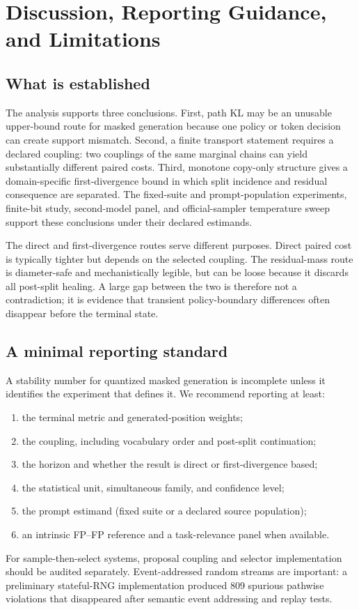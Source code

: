 \section{Discussion, Reporting Guidance, and Limitations}
\label{sec:discussion}

\subsection{What is established}
The analysis supports three conclusions. First, path KL may be an unusable upper-bound route for masked generation because one policy or token decision can create support mismatch. Second, a finite transport statement requires a declared coupling: two couplings of the same marginal chains can yield substantially different paired costs. Third, monotone copy-only structure gives a domain-specific first-divergence bound in which split incidence and residual consequence are separated. The fixed-suite and prompt-population experiments, finite-bit study, second-model panel, and official-sampler temperature sweep support these conclusions under their declared estimands.

The direct and first-divergence routes serve different purposes. Direct paired cost is typically tighter but depends on the selected coupling. The residual-mass route is diameter-safe and mechanistically legible, but can be loose because it discards all post-split healing. A large gap between the two is therefore not a contradiction; it is evidence that transient policy-boundary differences often disappear before the terminal state.

\subsection{A minimal reporting standard}
A stability number for quantized masked generation is incomplete unless it identifies the experiment that defines it. We recommend reporting at least:
\begin{enumerate}[leftmargin=1.6em,itemsep=2pt,topsep=2pt]
\item the terminal metric and generated-position weights;
\item the coupling, including vocabulary order and post-split continuation;
\item the horizon and whether the result is direct or first-divergence based;
\item the statistical unit, simultaneous family, and confidence level;
\item the prompt estimand (fixed suite or a declared source population);
\item an intrinsic FP--FP reference and a task-relevance panel when available.
\end{enumerate}
For sample-then-select systems, proposal coupling and selector implementation should be audited separately. Event-addressed random streams are important: a preliminary stateful-RNG implementation produced 809 spurious pathwise violations that disappeared after semantic event addressing and replay tests.

